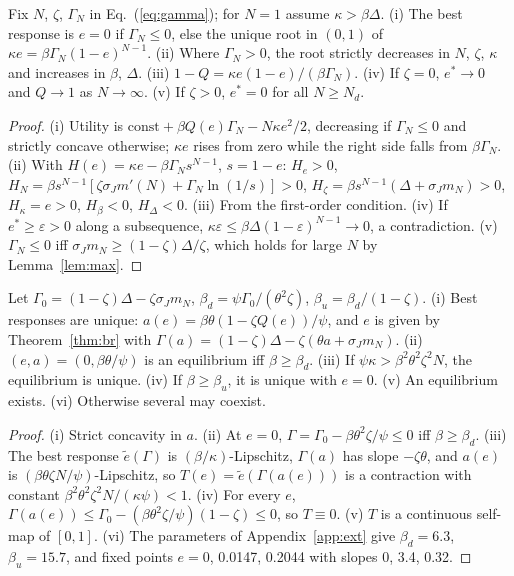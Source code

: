 \documentclass[acmsmall,screen,review,anonymous]{acmart}
\theoremstyle{acmdefinition}
\begin{document}
\begin{theorem}\label{thm:br}
Fix $N$, $\zeta$, $\Gamma_N$ in Eq.~(\ref{eq:gamma}); for $N = 1$ assume $\kappa > \beta\Delta$. (i) The best response is $e = 0$ if $\Gamma_N \le 0$, else the unique root in $(0,1)$ of $\kappa e = \beta\Gamma_N(1-e)^{N-1}$. (ii) Where $\Gamma_N > 0$, the root strictly decreases in $N$, $\zeta$, $\kappa$ and increases in $\beta$, $\Delta$. (iii) $1 - Q = \kappa e(1-e)/(\beta\Gamma_N)$. (iv) If $\zeta = 0$, $e^* \to 0$ and $Q \to 1$ as $N \to \infty$. (v) If $\zeta > 0$, $e^* = 0$ for all $N \ge N_d$.
\end{theorem}
\begin{proof}
(i) Utility is $\text{const} + \beta Q(e)\Gamma_N - N\kappa e^2/2$, decreasing if $\Gamma_N \le 0$ and strictly concave otherwise; $\kappa e$ rises from zero while the right side falls from $\beta\Gamma_N$. (ii) With $H(e) = \kappa e - \beta\Gamma_N s^{N-1}$, $s = 1-e$: $H_e > 0$, $H_N = \beta s^{N-1}[\zeta\sigma_J m'(N) + \Gamma_N\ln(1/s)] > 0$, $H_\zeta = \beta s^{N-1}(\Delta + \sigma_J m_N) > 0$, $H_\kappa = e > 0$, $H_\beta < 0$, $H_\Delta < 0$. (iii) From the first-order condition. (iv) If $e^* \ge \varepsilon > 0$ along a subsequence, $\kappa\varepsilon \le \beta\Delta(1-\varepsilon)^{N-1} \to 0$, a contradiction. (v) $\Gamma_N \le 0$ iff $\sigma_J m_N \ge (1-\zeta)\Delta/\zeta$, which holds for large $N$ by Lemma~\ref{lem:max}.
\end{proof}

\begin{theorem}[Equilibrium]\label{thm:eq}
Let $\Gamma_0 = (1-\zeta)\Delta - \zeta\sigma_J m_N$, $\beta_d = \psi\Gamma_0/(\theta^2\zeta)$, $\beta_u = \beta_d/(1-\zeta)$. (i) Best responses are unique: $a(e) = \beta\theta(1 - \zeta Q(e))/\psi$, and $e$ is given by Theorem~\ref{thm:br} with $\Gamma(a) = (1-\zeta)\Delta - \zeta(\theta a + \sigma_J m_N)$. (ii) $(e,a) = (0, \beta\theta/\psi)$ is an equilibrium iff $\beta \ge \beta_d$. (iii) If $\psi\kappa > \beta^2\theta^2\zeta^2N$, the equilibrium is unique. (iv) If $\beta \ge \beta_u$, it is unique with $e = 0$. (v) An equilibrium exists. (vi) Otherwise several may coexist.
\end{theorem}
\begin{proof}
(i) Strict concavity in $a$. (ii) At $e = 0$, $\Gamma = \Gamma_0 - \beta\theta^2\zeta/\psi \le 0$ iff $\beta \ge \beta_d$. (iii) The best response $\tilde{e}(\Gamma)$ is $(\beta/\kappa)$-Lipschitz, $\Gamma(a)$ has slope $-\zeta\theta$, and $a(e)$ is $(\beta\theta\zeta N/\psi)$-Lipschitz, so $T(e) = \tilde{e}(\Gamma(a(e)))$ is a contraction with constant $\beta^2\theta^2\zeta^2N/(\kappa\psi) < 1$. (iv) For every $e$, $\Gamma(a(e)) \le \Gamma_0 - (\beta\theta^2\zeta/\psi)(1-\zeta) \le 0$, so $T \equiv 0$. (v) $T$ is a continuous self-map of $[0,1]$. (vi) The parameters of Appendix~\ref{app:ext} give $\beta_d = 6.3$, $\beta_u = 15.7$, and fixed points $e = 0$, 0.0147, 0.2044 with slopes 0, 3.4, 0.32.
\end{proof}
\end{document}
